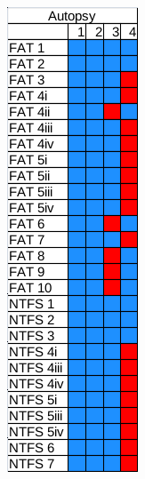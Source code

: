\begin{figure}[h!]
    \begin{subfigure}{0.3\linewidth}
        \includegraphics[width=\linewidth]{fig/autopsy_results.png}

\end{subfigure}
\end{figure}

